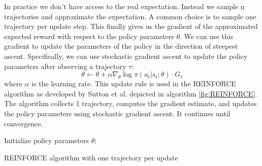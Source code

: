 In practice we don't have access to the real expectation. Instead we sample n trajectories and approximate the expectation.
A common choice is to sample one trajectory per update step. 
This finally gives us the gradient of the approximated expected reward with respect to the policy parameters $\theta$. We can use this gradient to update the parameters of the policy in the direction of steepest ascent. Specifically, we can use stochastic gradient ascent to update the policy parameters after observing a trajectory $\tau$:
\begin{equation}
    \label{reinf_update}
    \theta \leftarrow \theta + \alpha \nabla_{\theta} \log \pi(a_t|s_t;\theta) \cdot G_t
\end{equation}
where $\alpha$ is the learning rate. This update rule is used in the REINFORCE algorithm as developed by Sutton et al. \cite{NIPS1999_464d828b} depicted in algorithm \ref{fig:REINFORCE}.
The algorithm collects 1 trajectory, computes the gradient estimate, and updates the policy parameters using stochastic gradient ascent. 
It continues until convergence.

\begin{algorithm}[H]
    \SetAlgoLined
        Initialize policy parameters $\theta$;
    \caption{REINFORCE algorithm with one trajectory per update}
    \label{fig:REINFORCE}
\end{algorithm}
    


